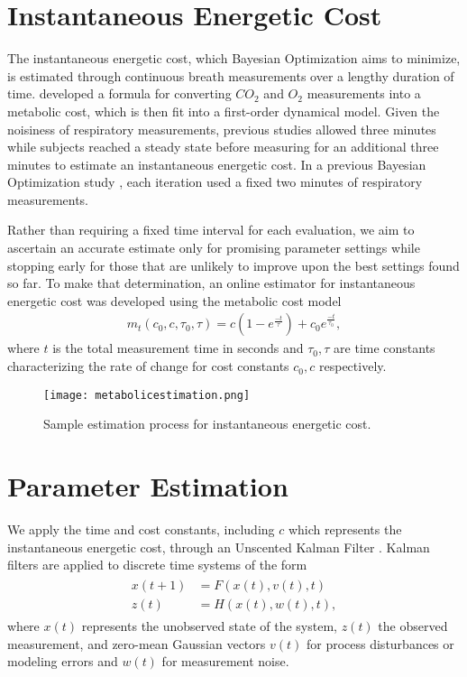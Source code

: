 \section{Instantaneous Energetic Cost}
The instantaneous energetic cost, which Bayesian Optimization aims to minimize, is estimated through continuous breath measurements over a lengthy duration of time. \citet{Brockway1987} developed a formula for converting $CO_2$ and $O_2$ measurements into a metabolic cost, which is then fit into a first-order dynamical model. Given the noisiness of respiratory measurements, previous studies \citep{Felt2015,Selinger2014} allowed three minutes while subjects reached a steady state before measuring for an additional three minutes to estimate an instantaneous energetic cost. In a previous Bayesian Optimization study \citep{Ding2018}, each iteration used a fixed two minutes of respiratory measurements. 

Rather than requiring a fixed time interval for each evaluation, we aim to ascertain an accurate estimate only for promising parameter settings while stopping early for those that are unlikely to improve upon the best settings found so far. To make that determination, an online estimator for instantaneous energetic cost was developed using the metabolic cost model
\begin{align}
m_t(c_0, c, \tau_0, \tau) = c(1-e^{\frac{-t}{\tau}}) + c_0e^{\frac{-t}{\tau_0}},
\end{align}
where $t$ is the total measurement time in seconds and $\tau_0, \tau$ are time constants characterizing the rate of change for cost constants $c_0, c$ respectively.

\begin{figure}[t]
\centering
\texttt{[image: metabolicestimation.png]}
\caption{Sample estimation process for instantaneous energetic cost.}
\label{fig:metabolicestimation}
\end{figure}

\section{Parameter Estimation}
We apply the time and cost constants, including $c$ which represents the instantaneous energetic cost, through an Unscented Kalman Filter \citep{julier1997}. Kalman filters are applied to discrete time systems of the form
\begin{align}\begin{split}
  x(t+1) &= F(x(t), v(t), t)\\
  z(t) &= H(x(t), w(t), t),
\end{split}\end{align}
where $x(t)$ represents the unobserved state of the system, $z(t)$ the observed measurement, and zero-mean Gaussian vectors $v(t)$ for process disturbances or modeling errors and $w(t)$ for measurement noise. 


